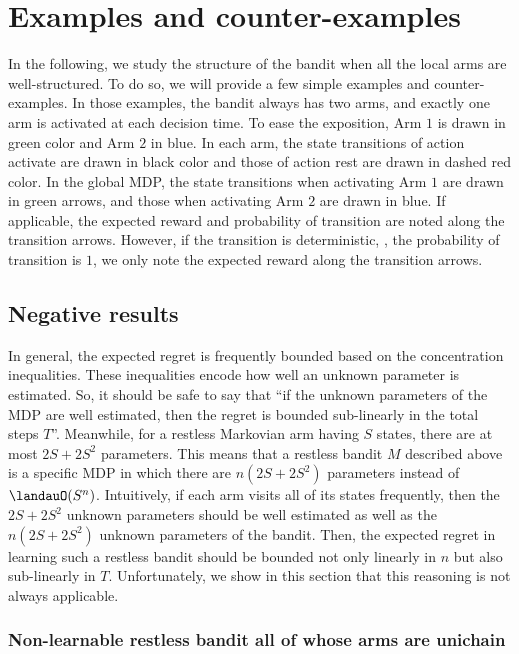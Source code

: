\section{Examples and counter-examples}
\label{ch:restless:sec:example}

In the following, we study the structure of the bandit when all the local arms are well-structured.
To do so, we will provide a few simple examples and counter-examples.
In those examples, the bandit always has two arms, and exactly one arm is activated at each decision time.
To ease the exposition, Arm $1$ is drawn in green color and Arm $2$ in blue.
In each arm, the state transitions of action activate are drawn in black color and those of action rest are drawn in dashed red color.
In the global MDP, the state transitions when activating Arm $1$ are drawn in green arrows, and those when activating Arm $2$ are drawn in blue.
If applicable, the expected reward and probability of transition are noted along the transition arrows.
However, if the transition is deterministic, \ie, the probability of transition is $1$, we only note the expected reward along the transition arrows.

\subsection{Negative results}

In general, the expected regret is frequently bounded based on the concentration inequalities. 
These inequalities encode how well an unknown parameter is estimated.
So, it should be safe to say that ``if the unknown parameters of the MDP are well estimated, then the regret is bounded sub-linearly in the total steps $T$''.
Meanwhile, for a restless Markovian arm having $S$ states, there are at most $2S+2S^2$ parameters.
This means that a restless bandit $M$ described above is a specific MDP in which there are $n(2S+2S^2)$ parameters instead of $\landauO(S^{n})$.
Intuitively, if each arm visits all of its states frequently, then the $2S+2S^2$ unknown parameters should be well estimated as well as the $n(2S+2S^2)$ unknown parameters of the bandit.
Then, the expected regret in learning such a restless bandit should be bounded not only linearly in $n$ but also sub-linearly in $T$.
Unfortunately, we show in this section that this reasoning is not always applicable.

\subsubsection{Non-learnable restless bandit all of whose arms are unichain}

